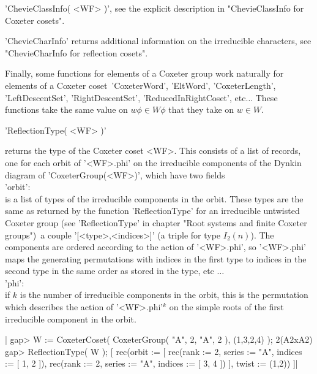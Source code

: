 'ChevieClassInfo(   <WF>   )',   see   the   explicit   description   in
"ChevieClassInfo for Coxeter cosets".

'ChevieCharInfo'   returns  additional   information  on   the  irreducible
characters, see "ChevieCharInfo for reflection cosets".

Finally,  some functions for elements of a Coxeter group work naturally for
elements  of a Coxeter  coset\:\ 'CoxeterWord', 'EltWord', 'CoxeterLength',
'LeftDescentSet',   'RightDescentSet',  'ReducedInRightCoset',  etc$\ldots$
These  functions take the same value on  $w\phi\in W\phi$ that they take on
$w\in W$.


'ReflectionType( <WF> )'

returns the type of the  Coxeter coset <WF>.   This consists of a list of
records, one for  each orbit of '<WF>.phi'  on the irreducible components
of the Dynkin diagram of 'CoxeterGroup(<WF>)', which have two fields\:\\

'orbit':\\ is a list of types of the irreducible components in the orbit.
   These  types are the  same as returned  by the function 'ReflectionType'
   for  an  irreducible  untwisted  Coxeter  group (see 'ReflectionType' in
   chapter   "Root  systems   and  finite   Coxeter  groups")\:\  a  couple
   '[<type>,<indices>]'  (a triple  for type  $I_2(n)$). The components are
   ordered  according to the  action of '<WF>.phi',  so '<WF>.phi' maps the
   generating permutations with indices in the first type to indices in the
   second  type in  the same  order as  stored in  the type, etc $\ldots$\\
   'phi':\\  if $k$ is  the number of  irreducible components in the orbit,
   this  is the permutation which describes the action of '<WF>.phi'$^k$ on
   the simple roots of the first irreducible component in the orbit.

|    gap> W := CoxeterCoset( CoxeterGroup( "A", 2, "A", 2 ), (1,3,2,4) );
    2(A2xA2)
    gap> ReflectionType( W );
    [ rec(orbit := [ rec(rank    := 2,
          series  := "A",
          indices := [ 1, 2 ]), rec(rank    := 2,
          series  := "A",
          indices := [ 3, 4 ]) ],
          twist := (1,2)) ]|

